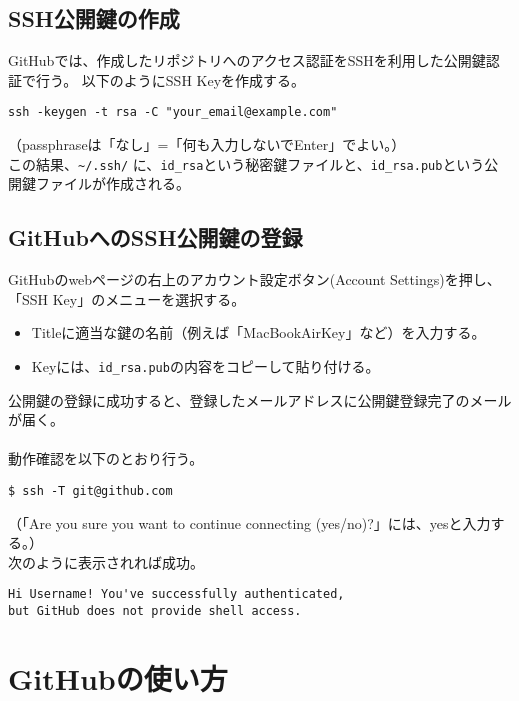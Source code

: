 \documentclass[11pt, oneside]{article}   	%
\begin{document}
\subsection{SSH公開鍵の作成}
GitHubでは、作成したリポジトリへのアクセス認証をSSHを利用した公開鍵認証で行う。
以下のようにSSH Keyを作成する。
\begin{lstlisting}
ssh -keygen -t rsa -C "your_email@example.com"
\end{lstlisting}
（passphraseは「なし」=「何も入力しないでEnter」でよい。）\\
この結果、\verb|~/.ssh/| に、\verb|id_rsa|という秘密鍵ファイルと、\verb|id_rsa.pub|という公開鍵ファイルが作成される。\\

\subsection{GitHubへのSSH公開鍵の登録}
GitHubのwebページの右上のアカウント設定ボタン(Account Settings)を押し、「SSH Key」のメニューを選択する。
\begin {itemize}
\item Titleに適当な鍵の名前（例えば「MacBookAirKey」など）を入力する。
\item Keyには、\verb|id_rsa.pub|の内容をコピーして貼り付ける。
\end{itemize}
公開鍵の登録に成功すると、登録したメールアドレスに公開鍵登録完了のメールが届く。\\ \\
動作確認を以下のとおり行う。
\begin{lstlisting}
$ ssh -T git@github.com
\end{lstlisting}
（「Are you sure you want to continue connecting (yes/no)?」には、yesと入力する。）\\
次のように表示されれば成功。
\begin{lstlisting}
Hi Username! You've successfully authenticated, 
but GitHub does not provide shell access.
\end{lstlisting}


\section{GitHubの使い方}
\end{document}
